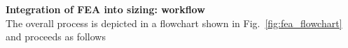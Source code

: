 \noindent \textbf{Integration of FEA into sizing: workflow} \\
\noindent The overall process is depicted in a flowchart shown in Fig.~\ref{fig:fea_flowchart} and proceeds as follows
